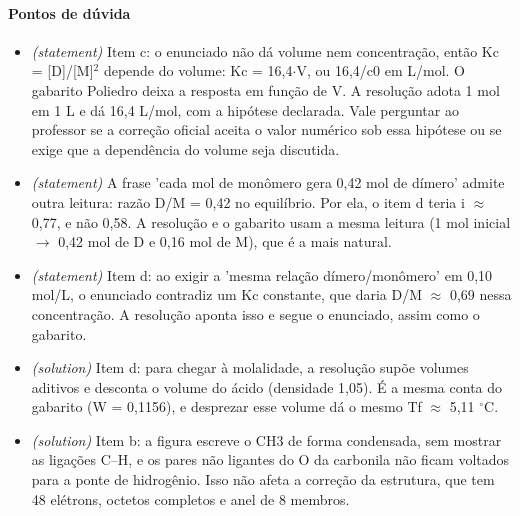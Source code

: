\documentclass{article}%
\begin{document}
\paragraph{Pontos de dúvida}%
\begin{itemize}%
\item%
\textit{(statement)} Item c: o enunciado não dá volume nem concentração, então Kc = {[}D{]}/{[}M{]}$^2$ depende do volume: Kc = 16,4$\cdot$V, ou 16,4/c0 em L/mol. O gabarito Poliedro deixa a resposta em função de V. A resolução adota 1 mol em 1 L e dá 16,4 L/mol, com a hipótese declarada. Vale perguntar ao professor se a correção oficial aceita o valor numérico sob essa hipótese ou se exige que a dependência do volume seja discutida.%
\item%
\textit{(statement)} A frase 'cada mol de monômero gera 0,42 mol de dímero' admite outra leitura: razão D/M = 0,42 no equilíbrio. Por ela, o item d teria i $\approx$ 0,77, e não 0,58. A resolução e o gabarito usam a mesma leitura (1 mol inicial $\to$ 0,42 mol de D e 0,16 mol de M), que é a mais natural.%
\item%
\textit{(statement)} Item d: ao exigir a 'mesma relação dímero/monômero' em 0,10 mol/L, o enunciado contradiz um Kc constante, que daria D/M $\approx$ 0,69 nessa concentração. A resolução aponta isso e segue o enunciado, assim como o gabarito.%
\item%
\textit{(solution)} Item d: para chegar à molalidade, a resolução supõe volumes aditivos e desconta o volume do ácido (densidade 1,05). É a mesma conta do gabarito (W = 0,1156), e desprezar esse volume dá o mesmo Tf $\approx$ 5,11 $^\circ$C.%
\item%
\textit{(solution)} Item b: a figura escreve o CH3 de forma condensada, sem mostrar as ligações C--H, e os pares não ligantes do O da carbonila não ficam voltados para a ponte de hidrogênio. Isso não afeta a correção da estrutura, que tem 48 elétrons, octetos completos e anel de 8 membros.%
\end{itemize}%
\end{document}
